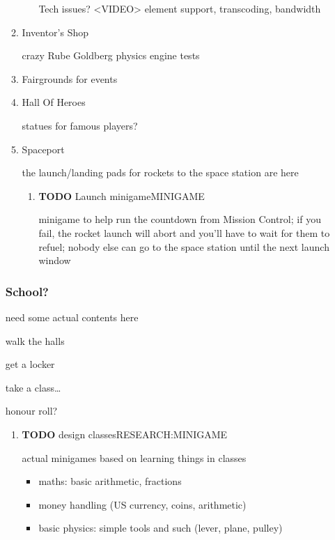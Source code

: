 \documentclass[11pt]{article}
\begin{document}
\begin{enumerate}
\begin{enumerate}
\begin{enumerate}
Tech issues? <VIDEO> element support, transcoding, bandwidth
\end{enumerate}
\item Inventor's Shop
\label{sec-4-1-1-5}

crazy Rube Goldberg physics engine tests
\item Fairgrounds
\label{sec-4-1-1-6}
for events

\item Hall Of Heroes
\label{sec-4-1-1-7}

statues for famous players?
\item Spaceport
\label{sec-4-1-1-8}

the launch/landing pads for rockets to the space station are here

\begin{enumerate}
\item {\bfseries\sffamily TODO} Launch minigame\hfill{}\textsc{MINIGAME}
\label{sec-4-1-1-8-1}

minigame to help run the countdown from Mission Control; if you fail,
the rocket launch will abort and you'll have to wait for them to
refuel; nobody else can go to the space station until the next launch
window
\end{enumerate}
\end{enumerate}
\subsubsection{School?}
\label{sec-4-1-2}

need some actual contents here

walk the halls

get a locker

take a class…

honour roll?

\begin{enumerate}
\item {\bfseries\sffamily TODO} design classes\hfill{}\textsc{RESEARCH:MINIGAME}
\label{sec-4-1-2-0-1}

actual minigames based on learning things in classes

\begin{itemize}
\item maths: basic arithmetic, fractions

\item money handling (US currency, coins, arithmetic)

\item basic physics: simple tools and such (lever, plane, pulley)


\end{itemize}
\end{enumerate}
\end{enumerate}
\end{document}
